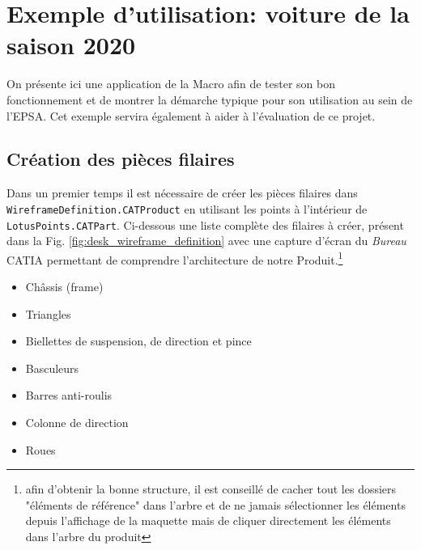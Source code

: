 \section{Exemple d'utilisation: voiture de la saison 2020}

\par On présente ici une application de la Macro afin de tester son bon fonctionnement et de montrer la démarche typique pour son utilisation au sein de l'EPSA. Cet exemple servira également à aider à l'évaluation de ce projet.

\subsection{Création des pièces filaires} %

\par Dans un premier temps il est nécessaire de créer les pièces filaires dans \texttt{WireframeDefinition.CATProduct} en utilisant les points à l'intérieur de \texttt{LotusPoints.CATPart}. Ci-dessous une liste complète des filaires à créer, présent dans la Fig. \ref{fig:desk_wireframe_definition} avec une capture d'écran du \textit{Bureau} CATIA permettant de comprendre l'architecture de notre Produit.\footnote{afin d'obtenir la bonne structure, il est conseillé de cacher tout les dossiers "éléments de référence" dans l'arbre et de ne jamais sélectionner les éléments depuis l'affichage de la maquette mais de cliquer directement les éléments dans l'arbre du produit}
\begin{itemize}
    \item Châssis (frame)
    \item Triangles
    \item Biellettes de suspension, de direction et pince
    \item Basculeurs
    \item Barres anti-roulis
    \item Colonne de direction
    \item Roues
\end{itemize}

